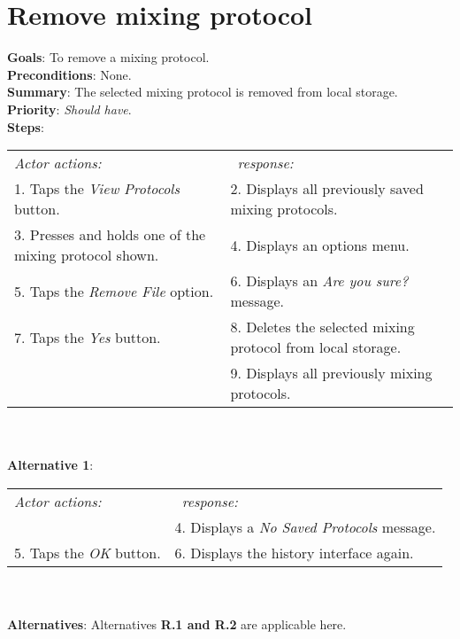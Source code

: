 \section{Remove mixing protocol}
 \label{removedist}
  \textbf{Goals}: To remove a mixing protocol.\\
  \textbf{Preconditions}: None.\\
  \textbf{Summary}: The selected mixing protocol is removed from local storage.\\
  \textbf{Priority}: \emph{Should have}.\\
  \textbf{Steps}: \\
    \begin{tabular}{ p{} p{} }
  	\emph{Actor actions:} & \emph{\projectname\ response:} \\
    1. Taps the \emph{View Protocols} button. & 2. Displays all previously saved mixing protocols.\\
    3. Presses and holds one of the mixing protocol shown. & 4. Displays an options menu. \\
    5. Taps the \emph{Remove File} option. & 6. Displays an \emph{Are you sure?} message.\\
    7. Taps the \emph{Yes} button. & 8. Deletes the selected mixing protocol from local storage. \\
     & 9. Displays all previously mixing protocols.\\
    \end{tabular}
                \\
     \\\textbf{Alternative 1}: \\
    \begin{tabular}{ p{} p{} }
  	\emph{Actor actions:} & \emph{\projectname\ response:} \\
            & 4. Displays a \emph{No Saved Protocols} message. \\
    5. Taps the \emph{OK} button. & 6. Displays the history interface again. \\
    \end{tabular}
    \\
    \\\textbf{Alternatives}: Alternatives \textbf{R.1 and R.2} are applicable here.
